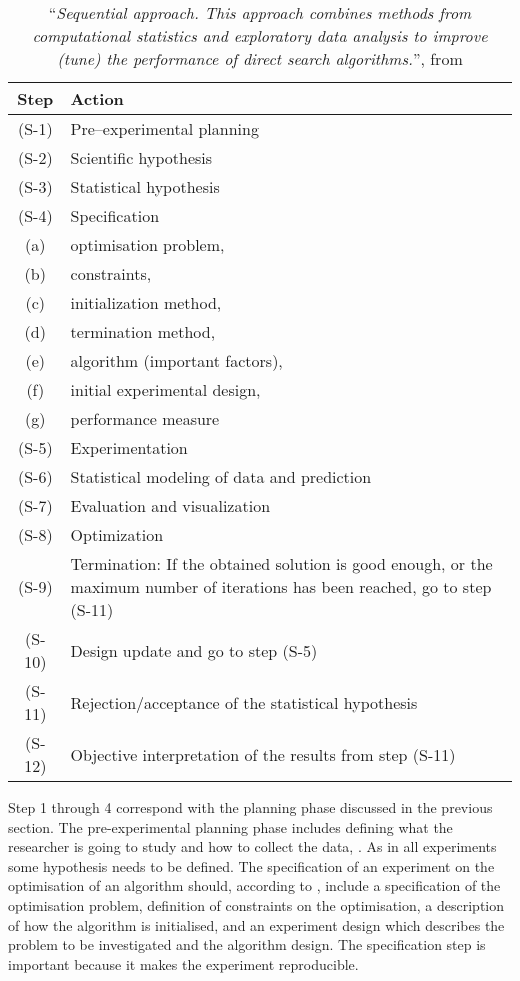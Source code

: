 \begin{table}[htdp]
\footnotesize
\begin{center}
\begin{tabular}{|c|p{10cm}|}
\hline
Step & Action\\
\hline
(S-1) & Pre–experimental planning\\
(S-2) & Scientific hypothesis\\
(S-3) & Statistical hypothesis\\
(S-4) & Specification\\
(a) & optimisation problem,\\
(b) & constraints,\\
(c) & initialization method,\\
(d) & termination method,\\
(e) & algorithm (important factors),\\ 
(f) & initial experimental design,\\ 
(g) & performance measure\\
(S-5) & Experimentation\\
(S-6) & Statistical modeling of data and prediction\\
(S-7) & Evaluation and visualization\\
(S-8) & Optimization\\
(S-9) & Termination: If the obtained solution is good enough, or the maximum number of iterations has
been reached, go to step (S-11)\\
(S-10) & Design update and go to step (S-5)\\
(S-11) & Rejection/acceptance of the statistical hypothesis\\
(S-12) & Objective interpretation of the results from step (S-11)\\
\hline
\end{tabular}
\caption{``\textit{Sequential approach. This approach combines methods from computational statistics and exploratory data analysis to improve (tune) the performance of direct search algorithms.}'', from \protect \cite[p. 417]{Bartz-Beielstein2004}}
\label{tab:experimentsequence}
\end{center}
\end{table}

Step 1 through 4 correspond with the planning phase discussed in the previous section. The pre-experimental planning phase includes defining what the researcher is going to study and how to collect the data, \parencite{Bartz-Beielstein2004}. As in all experiments some hypothesis needs to be defined. The specification of an experiment on the optimisation of an algorithm should, according to \citeauthor{Bartz-Beielstein2004}, include a specification of the optimisation problem, definition of constraints on the optimisation, a description of how the algorithm is initialised, and an experiment design which describes the problem to be investigated and the algorithm design. The specification step is important because it makes the experiment reproducible.

